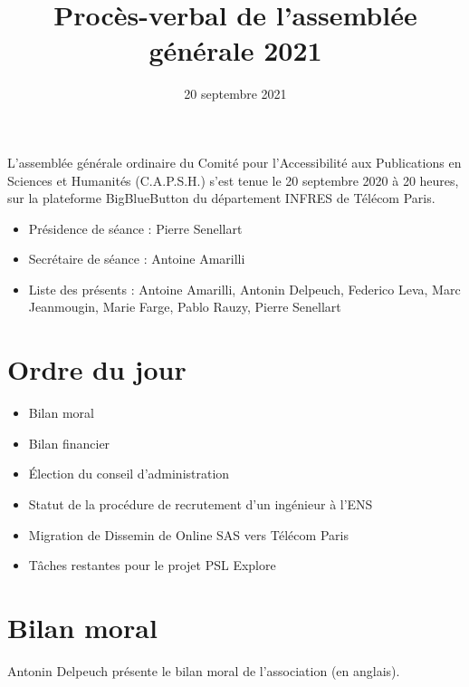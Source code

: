 \documentclass[a4paper]{article}
\title{Procès-verbal de l'assemblée générale 2021}
\date{20 septembre 2021}
\begin{document}
\maketitle

L'assemblée générale ordinaire du Comité pour l'Accessibilité aux Publications
en Sciences et Humanités (C.A.P.S.H.) s'est tenue le 20 septembre 2020 à 20 heures, sur la plateforme BigBlueButton du département INFRES de Télécom Paris. 

\begin{itemize}
  \item Présidence de séance : Pierre Senellart
  \item Secrétaire de séance : Antoine Amarilli
  \item Liste des présents : Antoine Amarilli, Antonin Delpeuch, Federico Leva, Marc Jeanmougin, Marie Farge, Pablo Rauzy, Pierre Senellart
\end{itemize}

\section{Ordre du jour}

\begin{itemize}
\item Bilan moral
\item Bilan financier
\item Élection du conseil d'administration
\item Statut de la procédure de recrutement d'un ingénieur à l'ENS
\item Migration de Dissemin de Online SAS vers Télécom Paris
\item Tâches restantes pour le projet PSL Explore
\end{itemize}

\section{Bilan moral}

Antonin Delpeuch présente le bilan moral de l'association (en anglais).
\end{document}
